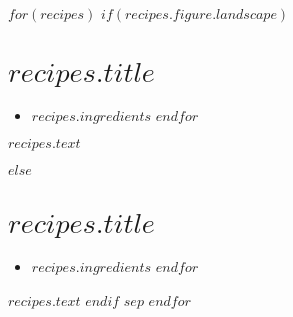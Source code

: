 \documentclass[a5paper,pdflatex]{scrartcl}
\begin{document}
$for(recipes)$
    $if(recipes.figure.landscape)$
    \section*{$recipes.title$}

    \begin{itemize}
    $for(recipes.ingredients)$
        \item $recipes.ingredients$
    $endfor$
    \end{itemize}

    $recipes.text$
    \begin{figure}[hb!]%
    \noindent{}
    \end{figure}
    $else$
    \begin{figure}[hp!]%
    \noindent{}
    \end{figure}
    \cleardoublepage

    \section*{$recipes.title$}
    \begin{itemize}
    $for(recipes.ingredients)$
        \item $recipes.ingredients$
    $endfor$
    \end{itemize}

    $recipes.text$
    $endif$
$sep$\clearpage
$endfor$
\end{document}
